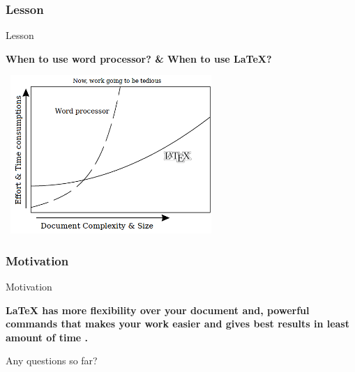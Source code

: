 \documentclass[11pt]{beamer}
\begin{document}
\subsubsection{Lesson}

\begin{frame}{Lesson}

\begin{center}
\textbf{When to use word processor? \& 
When to use \LaTeX ?}

\pause

\includegraphics[width = 8cm, height = 6cm]{graph}
\end{center}
\end{frame}

\subsubsection{Motivation}

\begin{frame}{Motivation}

\begin{tcolorbox}
\begin{center}

\bfseries \Large \LaTeX\hspace{0.01cm} has more flexibility over your document and, powerful commands that makes your work easier and gives best results in least amount of time .

\end{center}
\end{tcolorbox}

\end{frame}

\begin{frame}
\begin{center}
\Huge Any questions so far?
\end{center}
\end{frame}
\end{document}
